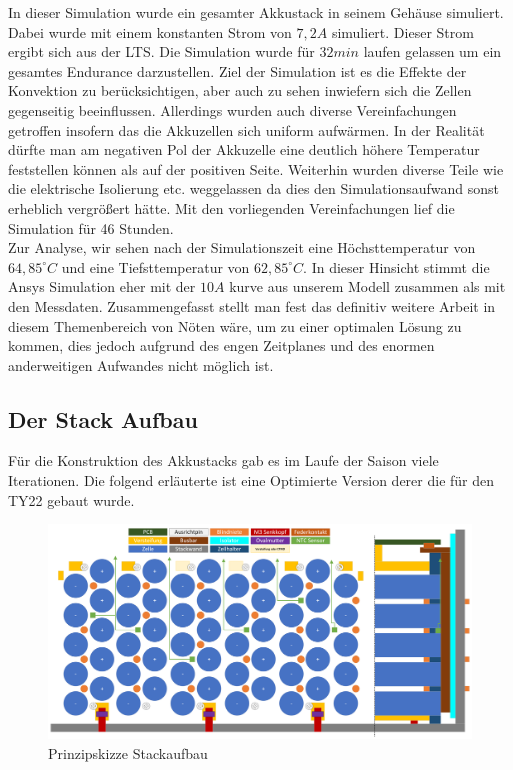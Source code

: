 In dieser Simulation wurde ein gesamter Akkustack in seinem Gehäuse simuliert. Dabei wurde mit einem konstanten Strom von \ensuremath{7,2 A} simuliert. Dieser Strom ergibt sich aus der \ac{LTS}. Die Simulation wurde für \ensuremath{32 min} laufen gelassen um ein gesamtes Endurance darzustellen. Ziel der Simulation ist es die Effekte der Konvektion zu berücksichtigen, aber auch zu sehen inwiefern sich die Zellen gegenseitig beeinflussen. Allerdings wurden auch diverse Vereinfachungen getroffen insofern das die Akkuzellen sich uniform aufwärmen. In der Realität dürfte man am negativen Pol der Akkuzelle eine deutlich höhere Temperatur feststellen können als auf der positiven Seite. Weiterhin wurden diverse Teile wie die elektrische Isolierung etc. weggelassen da dies den Simulationsaufwand sonst erheblich vergrößert hätte. Mit den vorliegenden Vereinfachungen lief die Simulation für 46 Stunden.\\
Zur Analyse, wir sehen nach der Simulationszeit eine Höchsttemperatur von \ensuremath{64,85^\circ C} und eine Tiefsttemperatur von \ensuremath{62,85^\circ C}. In dieser Hinsicht stimmt die Ansys Simulation eher mit der \ensuremath{10 A} kurve aus unserem Modell zusammen als mit den Messdaten. Zusammengefasst stellt man fest das definitiv weitere Arbeit in diesem Themenbereich von Nöten wäre, um zu einer optimalen Lösung zu kommen, dies jedoch aufgrund des engen Zeitplanes und des enormen anderweitigen Aufwandes nicht möglich ist.

\FloatBarrier
\subsection{Der Stack Aufbau} %

Für die Konstruktion des Akkustacks gab es im Laufe der Saison viele Iterationen. Die folgend erläuterte ist eine Optimierte Version derer die für den TY22 gebaut wurde.

\begin{figure}
	\centering
	\includegraphics[width=0.7\linewidth]{bilder/Stackaufbau_Prinzipskizze}
	\caption{Prinzipskizze Stackaufbau}
	\label{fig:stackaufbauprinzipskizze}
\end{figure}

